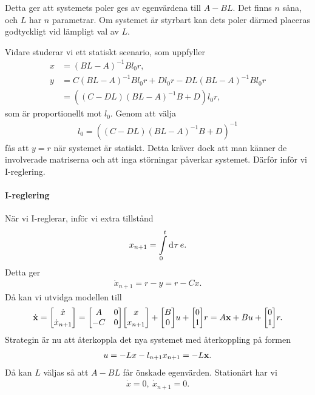 Detta ger att systemets poler ges av egenvärdena till $A - BL$. Det finns $n$ såna, och $L$ har $n$ parametrar. Om systemet är styrbart kan dets poler därmed placeras godtyckligt vid lämpligt val av $L$.

Vidare studerar vi ett statiskt scenario, som uppfyller
\begin{align*}
	x &= (BL - A)^{-1}Bl_{0}r, \\
	y &= C(BL - A)^{-1}Bl_{0}r + Dl_{0}r - DL(BL - A)^{-1}Bl_{0}r \\
	  &= \left((C - DL)(BL - A)^{-1}B + D\right)l_{0}r,
\end{align*}
som är proportionellt mot $l_{0}$. Genom att välja
\begin{align*}
	l_{0} = \left((C - DL)(BL - A)^{-1}B + D\right)^{-1}
\end{align*}
fås att $y = r$ när systemet är statiskt. Detta kräver dock att man känner de involverade matriserna och att inga störningar påverkar systemet. Därför inför vi I-reglering.

\paragraph{I-reglering}
När vi I-reglerar, inför vi extra tillstånd
\begin{align*}
	x_{n + 1} = \int\limits_{0}^{t}\dd[]{\tau}e.
\end{align*}
Detta ger
\begin{align*}
	\dot{x}_{n + 1} = r - y = r - Cx.
\end{align*}
Då kan vi utvidga modellen till
\begin{align*}
	\dot{\vb{x}} =
	\mqty[
		\dot{x} \\
		\dot{x}_{n + 1}
	]
	=
	\mqty[
		A  & 0 \\
		-C & 0
	]
	\mqty[
		x \\
		x_{n + 1}
	] +
	\mqty[
		B \\
		0
	]
	u
	+
	\mqty[
		0 \\
		1
	]
	r = A\vb{x} + Bu + 
	\mqty[
		0 \\
		1
	]
	r.
\end{align*}
Strategin är nu att återkoppla det nya systemet med återkoppling på formen
\begin{align*}
	u = -Lx - l_{n + 1}x_{n + 1} = -L\vb{x}.
\end{align*}
Då kan $L$ väljas så att $A - BL$ får önskade egenvärden. Stationärt har vi
\begin{align*}
	\dot{x} = 0,\ 	\dot{x}_{n + 1} = 0.
\end{align*}

